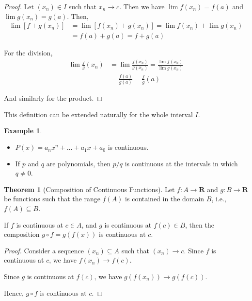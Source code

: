 \documentclass[12pt,a4paper]{article}
\theoremstyle{definition}
\newtheorem{theorem}{Theorem}[section]
\newtheorem{example}{Example}[section]
\begin{document}
\begin{proof}
	Let $(x_n) \in I$ such that $x_n \longrightarrow c$. Then we have $\lim f(x_n) = f(a)$ and $\lim g(x_n) = g(a)$. Then,
	\begin{equation*}
		\begin{aligned}
			\lim [f+g(x_n)] &= \lim [f(x_n) + g(x_n)] = \lim f(x_n) + \lim g(x_n) \\
			& = f(a) + g(a) = f+g(a)
		\end{aligned}
	\end{equation*}
	
	For the division,
	\begin{equation*}
		\begin{aligned}
			\lim \frac{f}{g} (x_n) &= \lim \frac{f(x_n)}{g(x_n)} = \frac{\lim f(x_n)}{\lim g(x_n)} \\
			&= \frac{f(a)}{g(a)} = \frac{f}{g} (a)
		\end{aligned}
	\end{equation*}
	
	And similarly for the product.
\end{proof}

This definition can be extended naturally for the whole interval $I$.

\begin{example}
\begin{itemize} \hfill
	\item $P(x) = a_n x^n + \ldots + a_1 x + a_0$ is continuous.
	\item If $p$ and $q$ are polynomials, then $p/q$ is continuous at the intervals in which $q \neq 0$.
\end{itemize}
\end{example}

\begin{theorem}[Composition of Continuous Functions]
	Let $f : A \longrightarrow \textbf{R}$ and $g : B \longrightarrow \textbf{R}$ be functions such that the range $f(A)$ is contained in the domain $B$, i.e., $f(A) \subseteq B$.
	
	If $f$ is continuous at $c \in A$, and $g$ is continuous at $f(c) \in B$, then the composition $g \circ f = g(f(x))$ is continuous at $c$.
\end{theorem}

\begin{proof}
	Consider a sequence $(x_n) \subseteq A$ such that $(x_n) \longrightarrow c$. Since $f$ is continuous at $c$, we have $f(x_n) \longrightarrow f(c)$. 
	
	Since $g$ is continuous at $f(c)$, we have $g(f(x_n)) \longrightarrow g(f(c))$.
	
	Hence, $g \circ f$ is continuous at $c$.
\end{proof}
\end{document}

